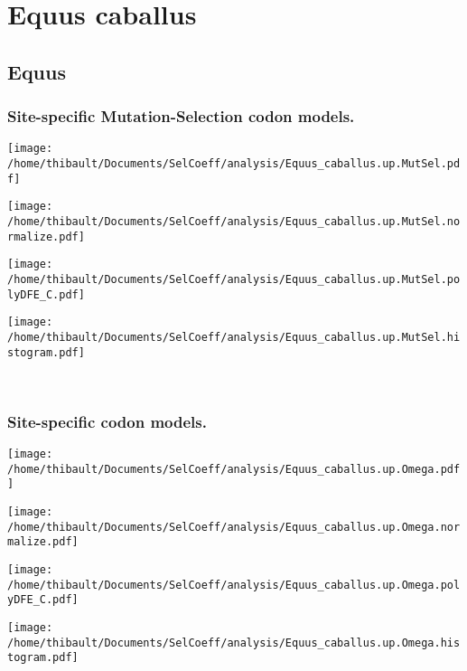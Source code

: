 \section{Equus caballus} 
 
\subsection{Equus} 
 
\subsubsection*{Site-specific Mutation-Selection codon models.} 
\begin{minipage}{0.49\linewidth} 
\texttt{[image: /home/thibault/Documents/SelCoeff/analysis/Equus\_caballus.up.MutSel.pdf]} 
\end{minipage}
\begin{minipage}{0.49\linewidth} 
\texttt{[image: /home/thibault/Documents/SelCoeff/analysis/Equus\_caballus.up.MutSel.normalize.pdf]} 
\end{minipage}
\begin{minipage}{0.49\linewidth} 
\texttt{[image: /home/thibault/Documents/SelCoeff/analysis/Equus\_caballus.up.MutSel.polyDFE\_C.pdf]} 
\end{minipage}
\begin{minipage}{0.49\linewidth} 
\texttt{[image: /home/thibault/Documents/SelCoeff/analysis/Equus\_caballus.up.MutSel.histogram.pdf]} 
\end{minipage}
\\ 
\subsubsection*{Site-specific codon models.} 
\begin{minipage}{0.49\linewidth} 
\texttt{[image: /home/thibault/Documents/SelCoeff/analysis/Equus\_caballus.up.Omega.pdf]} 
\end{minipage}
\begin{minipage}{0.49\linewidth} 
\texttt{[image: /home/thibault/Documents/SelCoeff/analysis/Equus\_caballus.up.Omega.normalize.pdf]} 
\end{minipage}
\begin{minipage}{0.49\linewidth} 
\texttt{[image: /home/thibault/Documents/SelCoeff/analysis/Equus\_caballus.up.Omega.polyDFE\_C.pdf]} 
\end{minipage}
\begin{minipage}{0.49\linewidth} 
\texttt{[image: /home/thibault/Documents/SelCoeff/analysis/Equus\_caballus.up.Omega.histogram.pdf]} 
\end{minipage}
\\ 
